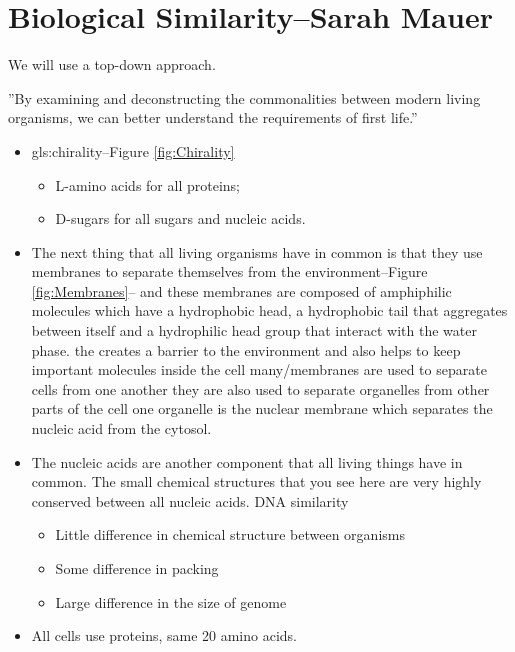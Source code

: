\documentclass[]{article}
\begin{document}
\section[Biological Similarity]{Biological Similarity--Sarah Mauer}

We will use a top-down approach.

 ''By examining and deconstructing the commonalities between modern living organisms, we can better understand the requirements of first life.''

\begin{itemize}
	\item \Gls{gls:chirality}--Figure \ref{fig:Chirality}
	\begin{itemize}
		\item L-amino acids for all proteins;
		\item D-sugars for all sugars and nucleic acids.
	\end{itemize}
	\item The next thing that all living organisms have in common
	is that they use membranes to separate themselves from the environment--Figure \ref{fig:Membranes}--
	and these membranes are composed of amphiphilic molecules which have a hydrophobic head, a hydrophobic tail that aggregates between itself and a hydrophilic head group that interact with the water phase. the creates a barrier to the environment and also helps to keep
	important molecules inside the cell
	many/membranes are used to separate cells from one another they are also used
	to separate organelles from other parts of the cell
	one organelle is the nuclear membrane which separates the nucleic acid from the cytosol.
	\item The nucleic acids are another component that all living things have in common. The small chemical structures that you see here are very highly conserved between all nucleic acids. DNA similarity\begin{itemize}
		\item Little difference in chemical structure between organisms
		\item Some difference in packing
		\item Large difference in the size of genome
	\end{itemize}
	\item All cells use proteins, same 20 amino acids.
\end{itemize}
\end{document}
